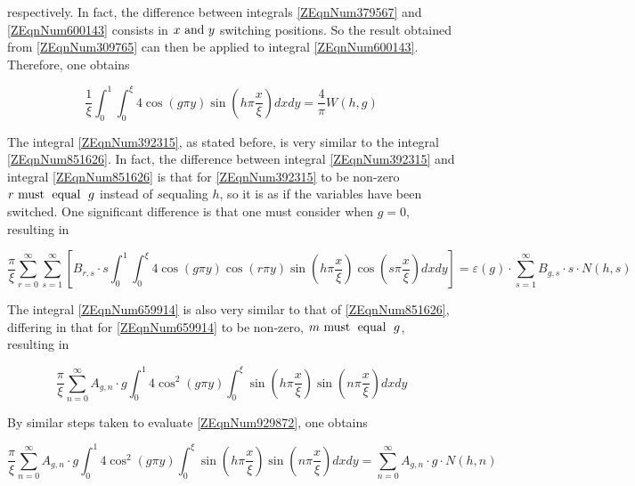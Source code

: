 respectively. In fact, the difference between integrals \eqref{ZEqnNum379567}
and \eqref{ZEqnNum600143} consists in $x\text{ and }y$ switching positions.
So the result obtained from \eqref{ZEqnNum309765} can then be applied to
integral \eqref{ZEqnNum600143}. Therefore, one obtains

\begin{equation} \label{3.29)} \frac{1}{\xi } \int _{0}^{1} \int _{0}^{\xi }4\cos
\left(g\pi y\right)\sin \left(h\pi \frac{x}{\xi } \right)dxdy =\frac{4}{\pi }
W\left(h,g\right) \end{equation}

 The integral \eqref{ZEqnNum392315}, as stated before, is very similar to the
 integral \eqref{ZEqnNum851626}. In fact, the difference between integral
 \eqref{ZEqnNum392315} and integral \eqref{ZEqnNum851626} is that for
 \eqref{ZEqnNum392315} to be non-zero $r \text{ must\; equal\; } g$ instead of
 $s$equaling $h$, so it is as if the variables have been switched. One
 significant difference is that one must consider when $g=0$, resulting in

\begin{equation} \label{3.30)} \frac{\pi }{\xi } \sum _{r=0}^{\infty } \sum
_{s=1}^{\infty } \left[B_{r,s} \cdot s\int _{0}^{1} \int _{0}^{\xi }4\cos
\left(g\pi y\right)\cos (r\pi y)\sin \left(h\pi \frac{x}{\xi } \right)\cos
\left(s\pi \frac{x}{\xi } \right)dxdy \right] =\varepsilon \left(g\right)\cdot
\sum _{s=1}^{\infty }B_{g,s} \cdot s\cdot N\left(h,s\right) \end{equation}

The integral \eqref{ZEqnNum659914} is also very similar to that of
\eqref{ZEqnNum851626}, differing in that for \eqref{ZEqnNum659914} to be
non-zero, $m \text{ must\; equal\; } g$, resulting in

\begin{equation} \label{3.31)} \frac{\pi }{\xi } \sum _{n=0}^{\infty }A_{g,n}
\cdot g\int _{0}^{1}4\cos ^{2} \left(g\pi y\right)\int _{0}^{\xi } \sin
\left(h\pi \frac{x}{\xi } \right)\sin \left(n\pi \frac{x}{\xi } \right) dxdy
\end{equation}

By similar steps taken to evaluate \eqref{ZEqnNum929872}, one obtains

\begin{equation} \label{3.32)} \frac{\pi }{\xi } \sum _{n=0}^{\infty }A_{g,n}
\cdot g\int _{0}^{1}4\cos ^{2} \left(g\pi y\right)\int _{0}^{\xi } \sin
\left(h\pi \frac{x}{\xi } \right)\sin \left(n\pi \frac{x}{\xi } \right)
dxdy=\sum _{n=0}^{\infty }A_{g,n} \cdot g\cdot N\left(h,n\right) \end{equation} 



